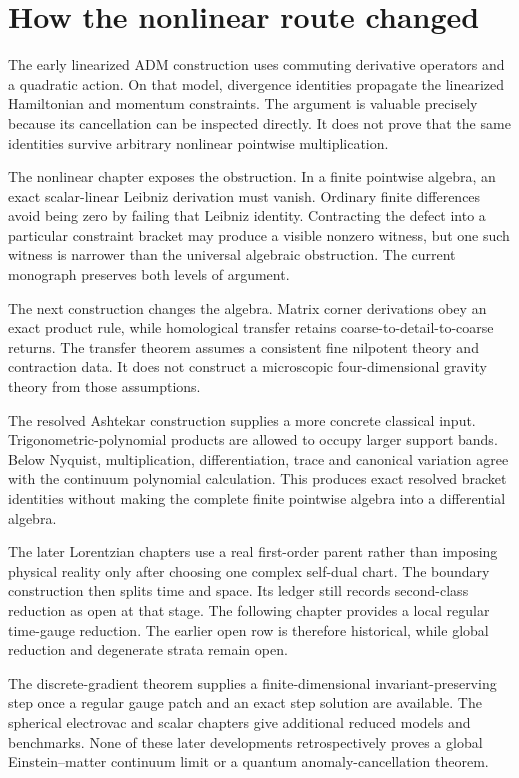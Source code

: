 \clearpage
\section{How the nonlinear route changed}\label{c:verify:chronology}

The early linearized ADM construction uses commuting derivative operators and a quadratic action. On that model, divergence identities propagate the linearized Hamiltonian and momentum constraints. The argument is valuable precisely because its cancellation can be inspected directly. It does not prove that the same identities survive arbitrary nonlinear pointwise multiplication.

The nonlinear chapter exposes the obstruction. In a finite pointwise algebra, an exact scalar-linear Leibniz derivation must vanish. Ordinary finite differences avoid being zero by failing that Leibniz identity. Contracting the defect into a particular constraint bracket may produce a visible nonzero witness, but one such witness is narrower than the universal algebraic obstruction. The current monograph preserves both levels of argument.

The next construction changes the algebra. Matrix corner derivations obey an exact product rule, while homological transfer retains coarse-to-detail-to-coarse returns. The transfer theorem assumes a consistent fine nilpotent theory and contraction data. It does not construct a microscopic four-dimensional gravity theory from those assumptions.

The resolved Ashtekar construction supplies a more concrete classical input. Trigonometric-polynomial products are allowed to occupy larger support bands. Below Nyquist, multiplication, differentiation, trace and canonical variation agree with the continuum polynomial calculation. This produces exact resolved bracket identities without making the complete finite pointwise algebra into a differential algebra.

The later Lorentzian chapters use a real first-order parent rather than imposing physical reality only after choosing one complex self-dual chart. The boundary construction then splits time and space. Its ledger still records second-class reduction as open at that stage. The following chapter provides a local regular time-gauge reduction. The earlier open row is therefore historical, while global reduction and degenerate strata remain open.

The discrete-gradient theorem supplies a finite-dimensional invariant-preserving step once a regular gauge patch and an exact step solution are available. The spherical electrovac and scalar chapters give additional reduced models and benchmarks. None of these later developments retrospectively proves a global Einstein--matter continuum limit or a quantum anomaly-cancellation theorem.



